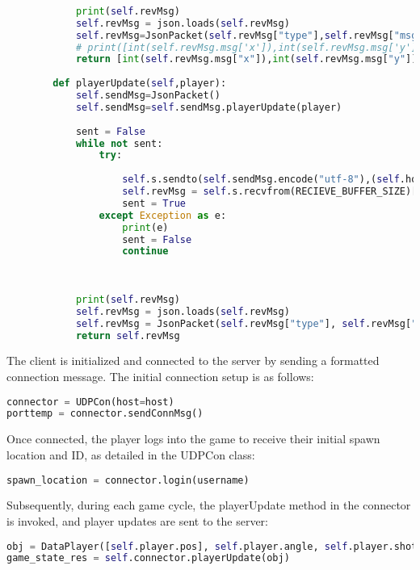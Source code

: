\begin{lstlisting}[language=Python]
    
            print(self.revMsg)
            self.revMsg = json.loads(self.revMsg)
            self.revMsg=JsonPacket(self.revMsg["type"],self.revMsg["msg"])
            # print([int(self.revMsg.msg['x']),int(self.revMsg.msg['y']),int(self.revMsg.msg['id'])])
            return [int(self.revMsg.msg["x"]),int(self.revMsg.msg["y"]),int(self.revMsg.msg["id"])]
            
        def playerUpdate(self,player):
            self.sendMsg=JsonPacket()
            self.sendMsg=self.sendMsg.playerUpdate(player)
    
            sent = False
            while not sent:
                try:
    
                    self.s.sendto(self.sendMsg.encode("utf-8"),(self.host,self.port))
                    self.revMsg = self.s.recvfrom(RECIEVE_BUFFER_SIZE)[0]
                    sent = True
                except Exception as e:
                    print(e)
                    sent = False
                    continue
            
    
    
            print(self.revMsg)
            self.revMsg = json.loads(self.revMsg)
            self.revMsg = JsonPacket(self.revMsg["type"], self.revMsg["msg"])
            return self.revMsg
\end{lstlisting}

The client is initialized and connected to the server by sending a formatted connection message. The initial connection setup is as follows:

\begin{lstlisting}[language=Python]
connector = UDPCon(host=host)
porttemp = connector.sendConnMsg()
\end{lstlisting}

Once connected, the player logs into the game to receive their initial spawn location and ID, as detailed in the UDPCon class:

\begin{lstlisting}[language=Python]
spawn_location = connector.login(username)
\end{lstlisting}

Subsequently, during each game cycle, the playerUpdate method in the connector is invoked, and player updates are sent to the server:

\begin{lstlisting}[language=Python]
obj = DataPlayer([self.player.pos], self.player.angle, self.player.shot, self.player.health, self.player.shotWho)
game_state_res = self.connector.playerUpdate(obj)
\end{lstlisting}

